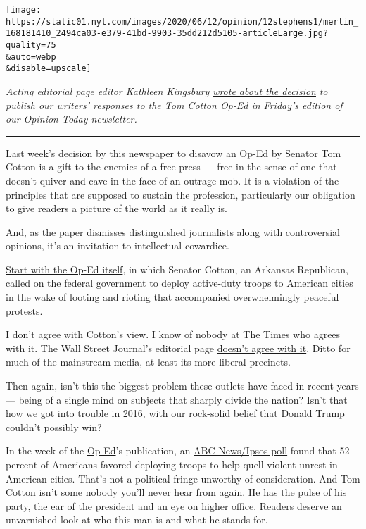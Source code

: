 \texttt{[image: https://static01.nyt.com/images/2020/06/12/opinion/12stephens1/merlin\_168181410\_2494ca03-e379-41bd-9903-35dd212d5105-articleLarge.jpg?quality=75\\\&auto=webp\\\&disable=upscale]}

\emph{Acting editorial page editor Kathleen Kingsbury}
\href{https://www.nytimes.com/2020/06/12/opinion/tom-cotton-new-york-times.html}{\emph{wrote
about the decision}} \emph{to publish our writers' responses to the Tom
Cotton Op-Ed in Friday's edition of our Opinion Today newsletter.}

\begin{center}\rule{0.5\linewidth}{\linethickness}\end{center}

Last week's decision by this newspaper to disavow an Op-Ed by Senator
Tom Cotton is a gift to the enemies of a free press --- free in the
sense of one that doesn't quiver and cave in the face of an outrage mob.
It is a violation of the principles that are supposed to sustain the
profession, particularly our obligation to give readers a picture of the
world as it really is.

And, as the paper dismisses distinguished journalists along with
controversial opinions, it's an invitation to intellectual cowardice.

\href{https://www.nytimes.com/2020/06/03/opinion/tom-cotton-protests-military.html}{Start
with the Op-Ed itself}, in which Senator Cotton, an Arkansas Republican,
called on the federal government to deploy active-duty troops to
American cities in the wake of looting and rioting that accompanied
overwhelmingly peaceful protests.

I don't agree with Cotton's view. I know of nobody at The Times who
agrees with it. The Wall Street Journal's editorial page
\href{https://www.wsj.com/articles/dont-call-in-the-troops-11591054305}{doesn't
agree with it}. Ditto for much of the mainstream media, at least its
more liberal precincts.

Then again, isn't this the biggest problem these outlets have faced in
recent years --- being of a single mind on subjects that sharply divide
the nation? Isn't that how we got into trouble in 2016, with our
rock-solid belief that Donald Trump couldn't possibly win?

In the week of the
\href{https://www.nytimes.com/2020/06/03/opinion/tom-cotton-protests-military.html}{Op-Ed}'s
publication, an
\href{https://abcnews.go.com/Politics/52-americans-support-deploying-military-control-violent-protests/story?id=71097167}{ABC
News/Ipsos poll} found that 52 percent of Americans favored deploying
troops to help quell violent unrest in American cities. That's not a
political fringe unworthy of consideration. And Tom Cotton isn't some
nobody you'll never hear from again. He has the pulse of his party, the
ear of the president and an eye on higher office. Readers deserve an
unvarnished look at who this man is and what he stands for.

